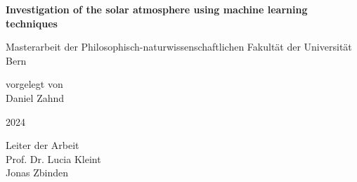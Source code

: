 
\begin{titlepage}
\begin{center}
\vspace*{3.5cm}

\huge \textbf{Investigation of the solar atmosphere using machine learning techniques}

\vspace{2.5cm}

\Large Masterarbeit der Philosophisch-naturwissenschaftlichen Fakultät der Universität Bern \\

\vspace{2.0cm}

\Large vorgelegt von \\
\vspace{0.2cm}
\Large Daniel Zahnd \normalsize\\

\vspace{2.1cm}

\Large 2024 \normalsize \\

\vspace{2.1cm}

\Large Leiter der Arbeit \\
\vspace{0.2cm}
\Large Prof. Dr. Lucia Kleint \\
\Large Jonas Zbinden


\centering    

    
\end{center}
\end{titlepage}

%
%
%
%
%
%
%
%
%    

